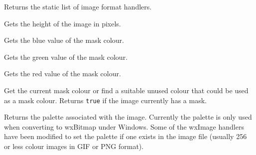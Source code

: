 \label{wximagegethandlers}


Returns the static list of image format handlers.




\label{wximagegetheight}


Gets the height of the image in pixels.


\label{wximagegetmaskblue}


Gets the blue value of the mask colour.


\label{wximagegetmaskgreen}


Gets the green value of the mask colour.


\label{wximagegetmaskred}


Gets the red value of the mask colour.


\label{wximagegetgetorsetmaskcolour}


Get the current mask colour or find a suitable unused colour that could be
used as a mask colour. Returns {\tt true} if the image currently has a mask.


\label{wximagegetpalette}


Returns the palette associated with the image. Currently the palette is only
used when converting to wxBitmap under Windows. Some of the wxImage handlers
have been modified to set the palette if one exists in the image file (usually
256 or less colour images in GIF or PNG format).


\label{wximagegetred}


